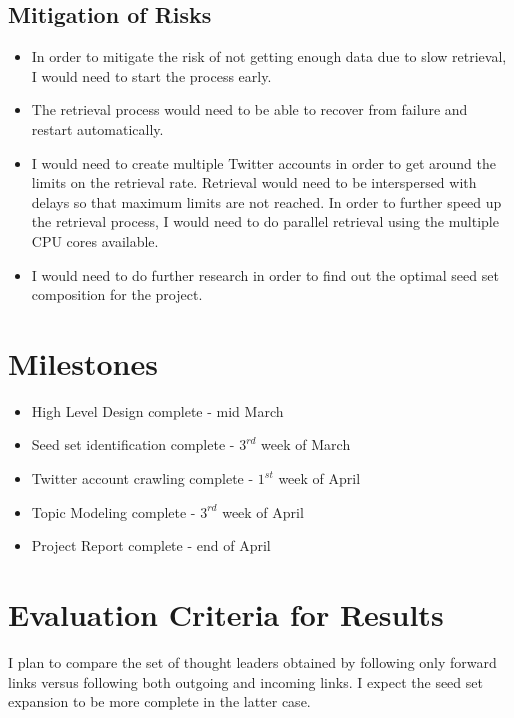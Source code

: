 \documentclass{sig-alternate-05-2015}
\begin{document}
\subsection{Mitigation of Risks}

\begin{itemize}

\item In order to mitigate the risk of not getting enough data due to slow retrieval, I would need to start the process early.

\item The retrieval process would need to be able to recover from failure and restart automatically.

\item I would need to create multiple Twitter accounts in order to get around the limits on the retrieval rate. Retrieval would need to be interspersed with delays so that maximum limits are not reached. In order to further speed up the retrieval process, I would need to do parallel retrieval using the multiple CPU cores available.

\item I would need to do further research in order to find out the optimal seed set composition for the project.

\end{itemize}

\section{Milestones}
\begin{itemize}
\item High Level Design complete - mid March
\item Seed set identification complete - $3^{rd}$ week of March
\item Twitter account crawling complete - $1^{st}$ week of April
\item Topic Modeling complete - $3^{rd}$ week of April
\item Project Report complete - end of April
\end{itemize}
\section{Evaluation Criteria for Results}

I plan to compare the set of thought leaders obtained by following only forward links versus following both outgoing and incoming links. I expect the seed set expansion to be more complete in the latter case. 
\end{document}
